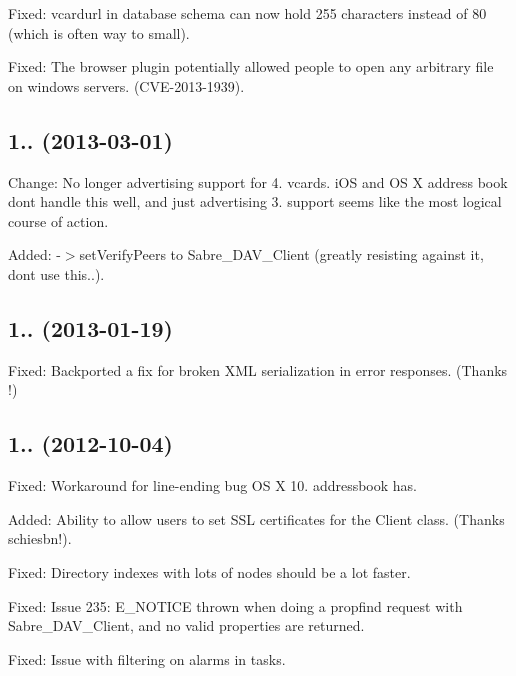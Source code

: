 \begin{DoxyItemize}
\item Fixed\+: vcardurl in database schema can now hold 255 characters instead of 80 (which is often way to small).
\item Fixed\+: The browser plugin potentially allowed people to open any arbitrary file on windows servers. (C\+V\+E-\/2013-\/1939).
\end{DoxyItemize}

\subsection*{1.. (2013-\/03-\/01) }


\begin{DoxyItemize}
\item Change\+: No longer advertising support for 4. vcards. i\+OS and OS X address book don\textquotesingle{}t handle this well, and just advertising 3. support seems like the most logical course of action.
\item Added\+: -\/$>$set\+Verify\+Peers to Sabre\+\_\+\+D\+A\+V\+\_\+\+Client (greatly resisting against it, don\textquotesingle{}t use this..).
\end{DoxyItemize}

\subsection*{1.. (2013-\/01-\/19) }


\begin{DoxyItemize}
\item Fixed\+: Backported a fix for broken X\+ML serialization in error responses. (Thanks !)
\end{DoxyItemize}

\subsection*{1.. (2012-\/10-\/04) }


\begin{DoxyItemize}
\item Fixed\+: Workaround for line-\/ending bug OS X 10. addressbook has.
\item Added\+: Ability to allow users to set S\+SL certificates for the Client class. (Thanks schiesbn!).
\item Fixed\+: Directory indexes with lots of nodes should be a lot faster.
\item Fixed\+: Issue 235\+: E\+\_\+\+N\+O\+T\+I\+CE thrown when doing a propfind request with Sabre\+\_\+\+D\+A\+V\+\_\+\+Client, and no valid properties are returned.
\item Fixed\+: Issue with filtering on alarms in tasks.
\end{DoxyItemize}

